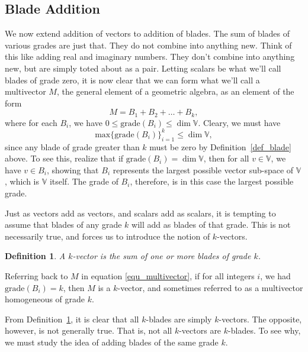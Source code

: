\documentclass[12pt]{article}
\newcommand{\V}{\mathbb{V}}
\newtheorem{definition}{Definition}[section]
\begin{document}
\subsection{Blade Addition}

We now extend addition of vectors to addition of blades.  The sum of blades
of various grades are just that.  They do not combine into anything new.
Think of this like adding real and imaginary numbers.  They don't combine
into anything new, but are simply toted about as a pair.  Letting scalars
be what we'll call blades of grade zero, it is now clear that we can form
what we'll call a multivector $M$, the general element of a geometric algebra,
as an element of the form
\begin{equation}\label{equ_multivector}
M = B_1 + B_2 + \dots + B_k,
\end{equation}
where for each $B_i$, we have $0\leq\mbox{grade}(B_i)\leq\dim\V$.
Cleary, we must have
\begin{equation}
\mbox{max}\{\mbox{grade}(B_i)\}_{i=1}^k\leq\dim\V,
\end{equation}
since any blade of grade greater than $k$ must be zero by Definition~\ref{def_blade} above.
To see this, realize that if $\mbox{grade}(B_i)=\dim\V$, then for all $v\in\V$, we have $v\in B_i$,
showing that $B_i$ represents the largest possible vector sub-space of $\V$, which is $\V$ itself.  The
grade of $B_i$, therefore, is in this case the largest possible grade.

Just as vectors add as vectors, and scalars add as scalars, it is tempting to assume
that blades of any grade $k$ will add as blades of that grade.  This is not necessarily true,
and forces us to introduce the notion of $k$-vectors.
\begin{definition}\label{def_k_vector}
A $k$-vector is the sum of one or more blades of grade $k$.
\end{definition}
Referring back to $M$ in equation \eqref{equ_multivector}, if for all integers $i$, we had
$\mbox{grade}(B_i)=k$, then $M$ is a $k$-vector, and sometimes referred
to as a multivector homogeneous of grade $k$.

From Definition~\ref{def_k_vector}, it is clear that all $k$-blades are simply
$k$-vectors.  The opposite, however, is not generally true.
That is, not all $k$-vectors are
$k$-blades.  To see why, we must study the idea of adding blades of the
same grade $k$.
\end{document}
